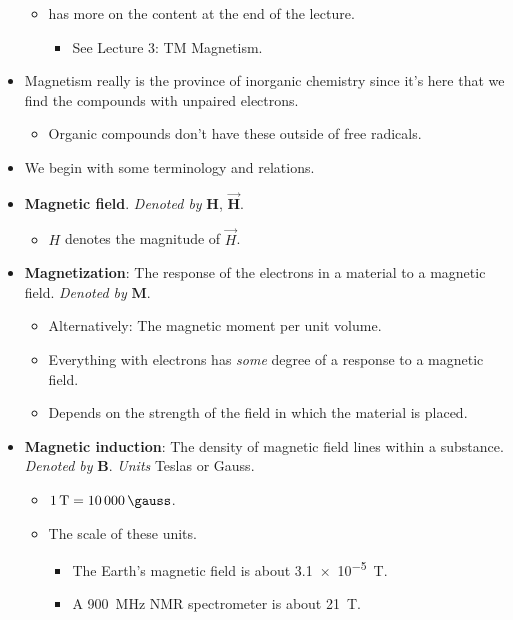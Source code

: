 \documentclass[../notes.tex]{subfiles}
\begin{document}
\begin{itemize}
\begin{itemize}
\begin{itemize}
        \end{itemize}
        \item \textcite{bib:CHEM20200Notes} has more on the content at the end of the lecture.
        \begin{itemize}
            \item See Lecture 3: TM Magnetism.
        \end{itemize}
    \end{itemize}
    \item Magnetism really is the province of inorganic chemistry since it's here that we find the compounds with unpaired electrons.
    \begin{itemize}
        \item Organic compounds don't have these outside of free radicals.
    \end{itemize}
    \item We begin with some terminology and relations.
    \item \textbf{Magnetic field}. \emph{Denoted by} $\bm{H}$, $\bm{\vec{H}}$.
    \begin{itemize}
        \item $H$ denotes the magnitude of $\vec{H}$.
    \end{itemize}
    \item \textbf{Magnetization}: The response of the electrons in a material to a magnetic field. \emph{Denoted by} $\bm{M}$.
    \begin{itemize}
        \item Alternatively: The magnetic moment per unit volume.
        \item Everything with electrons has \emph{some} degree of a response to a magnetic field.
        \item Depends on the strength of the field in which the material is placed.
    \end{itemize}
    \item \textbf{Magnetic induction}: The density of magnetic field lines within a substance. \emph{Denoted by} $\bm{B}$. \emph{Units} Teslas or Gauss.
    \begin{itemize}
        \item $\SI{1}{\tesla}=\SI{10000}{\gauss}$.
        \item The scale of these units.
        \begin{itemize}
            \item The Earth's magnetic field is about \SI{3.1e-5}{\tesla}.
            \item A \SI{900}{\mega\hertz} NMR spectrometer is about \SI{21}{\tesla}.

\end{itemize}
\end{itemize}
\end{itemize}
\end{document}
